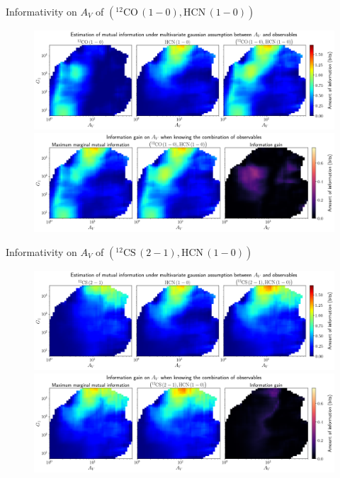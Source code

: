 \documentclass{beamer}
\begin{document}
\begin{frame}{Informativity on $A_V$ of $\left(\mathrm{^{12}CO\,(1-0)},\mathrm{HCN\,(1-0)}\right)$}
    \begin{figure}
        \centering
        \includegraphics[width=0.95\linewidth]{../linearinfogauss/av__12co10_hcn10_linearinfogauss.png}
        \vfill
        \includegraphics[width=0.95\linewidth]{../linearinfogauss/av__12co10_hcn10_linearinfogauss_gain.png}
    \end{figure}
\end{frame}

\begin{frame}{Informativity on $A_V$ of $\left(\mathrm{^{12}CS\,(2-1)},\mathrm{HCN\,(1-0)}\right)$}
    \begin{figure}
        \centering
        \includegraphics[width=0.95\linewidth]{../linearinfogauss/av__12cs21_hcn10_linearinfogauss.png}
        \vfill
        \includegraphics[width=0.95\linewidth]{../linearinfogauss/av__12cs21_hcn10_linearinfogauss_gain.png}
    \end{figure}
\end{frame}
\end{document}
